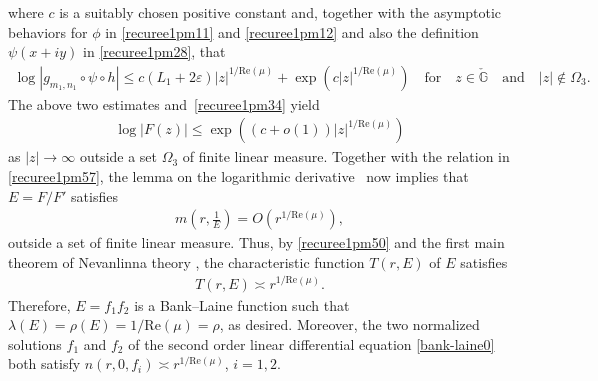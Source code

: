 \documentclass[12pt]{amsart}
\numberwithin{equation}{section}
\begin{document}
where $c$ is a suitably chosen positive constant and, together with the asymptotic behaviors for $\phi$ in \eqref{recuree1pm11} and \eqref{recuree1pm12} and also the definition $\psi(x+iy)$ in \eqref{recuree1pm28}, that
\begin{equation*}%
\begin{split}
\log|g_{m_1,n_1} \circ \psi \circ h| \leq c(L_1+2\varepsilon)|z|^{1/\text{Re}(\mu)}+\exp(c|z|^{1/\text{Re}(\mu)}) \quad \text{for}\quad  z\in \check{\mathbb{G}} \quad  \text{and} \quad |z|\not\in \Omega_3.
\end{split}
\end{equation*}
The above two estimates and~\eqref{recuree1pm34} yield
\begin{equation}\label{recuree1pm57}
\begin{split}
\log|F(z)|\leq \exp((c+o(1))|z|^{1/\text{Re}(\mu)})
\end{split}
\end{equation}
as $|z|\to\infty$ outside a set $\Omega_3$ of finite linear measure. Together with the relation in \eqref{recuree1pm57}, the lemma on the logarithmic derivative~\cite[Section~2.2]{Hayman1964Meromorphic} now implies that $E=F/F'$ satisfies
\begin{equation}\label{recuree1pm58}
\begin{split}
m\left(r,\frac{1}{E}\right)=O(r^{1/\text{Re}(\mu)}),
\end{split}
\end{equation}
outside a set of finite linear measure. Thus, by \eqref{recuree1pm50} and the first main theorem of Nevanlinna theory \cite[Section~1.3]{Hayman1964Meromorphic}, the characteristic function $T(r,E)$ of $E$ satisfies
\begin{equation*}%
\begin{split}
T\left(r,E\right)\asymp r^{1/\text{Re}(\mu)}.
\end{split}
\end{equation*}
Therefore, $E=f_1f_2$ is a Bank--Laine function such that $\lambda(E)=\rho(E)=1/\text{Re}(\mu)=\rho$, as desired. Moreover, the two normalized solutions $f_1$ and $f_2$ of the second order linear differential equation \eqref{bank-laine0} both satisfy $n(r,0,f_i)\asymp r^{1/\text{Re}(\mu)}$, $i=1,2$.
\end{document}
